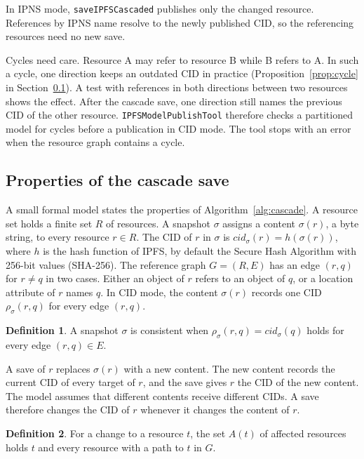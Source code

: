 \documentclass[5p,times,twocolumn]{elsarticle}
\theoremstyle{definition}
\newtheorem{definition}{Definition}
\theoremstyle{plain}
\begin{document}
In IPNS mode, \texttt{saveIPFSCascaded} publishes only the changed resource. References by IPNS name resolve to the newly published CID, so the referencing resources need no new save.

Cycles need care. Resource A may refer to resource B while B refers to A. In such a cycle, one direction keeps an outdated CID in practice (Proposition~\ref{prop:cycle} in Section~\ref{sec:rq2-properties}). A test with references in both directions between two resources shows the effect. After the cascade save, one direction still names the previous CID of the other resource. \texttt{IPFSModelPublishTool} therefore checks a partitioned model for cycles before a publication in CID mode. The tool stops with an error when the resource graph contains a cycle.

\subsection{Properties of the cascade save}\label{sec:rq2-properties}

A small formal model states the properties of Algorithm~\ref{alg:cascade}. A resource set holds a finite set $R$ of resources. A snapshot $\sigma$ assigns a content $\sigma(r)$, a byte string, to every resource $r \in R$. The CID of $r$ in $\sigma$ is $\mathit{cid}_\sigma(r) = h(\sigma(r))$, where $h$ is the hash function of IPFS, by default the Secure Hash Algorithm with 256-bit values (SHA-256). The reference graph $G = (R, E)$ has an edge $(r, q)$ for $r \neq q$ in two cases. Either an object of $r$ refers to an object of $q$, or a location attribute of $r$ names $q$. In CID mode, the content $\sigma(r)$ records one CID $\rho_\sigma(r, q)$ for every edge $(r, q)$.

\begin{definition}\label{def:consistent}
A snapshot $\sigma$ is consistent when $\rho_\sigma(r, q) = \mathit{cid}_\sigma(q)$ holds for every edge $(r, q) \in E$.
\end{definition}

A save of $r$ replaces $\sigma(r)$ with a new content. The new content records the current CID of every target of $r$, and the save gives $r$ the CID of the new content. The model assumes that different contents receive different CIDs. A save therefore changes the CID of $r$ whenever it changes the content of $r$.

\begin{definition}\label{def:affected}
For a change to a resource $t$, the set $A(t)$ of affected resources holds $t$ and every resource with a path to $t$ in $G$.
\end{definition}
\end{document}
